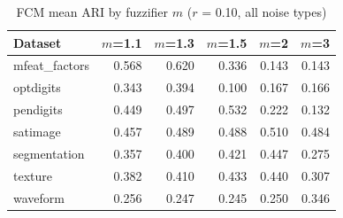 \begin{table}[t]
\centering
\scriptsize
\setlength{\tabcolsep}{3pt}
\caption{FCM mean ARI by fuzzifier $m$ ($r$ = 0.10, all noise types)}
\label{tab:fcm-m}
\begin{tabular}{lrrrrr}
\toprule
Dataset & $m$=1.1 & $m$=1.3 & $m$=1.5 & $m$=2 & $m$=3 \\
\midrule
mfeat\_factors & 0.568 & 0.620 & 0.336 & 0.143 & 0.143 \\
optdigits & 0.343 & 0.394 & 0.100 & 0.167 & 0.166 \\
pendigits & 0.449 & 0.497 & 0.532 & 0.222 & 0.132 \\
satimage & 0.457 & 0.489 & 0.488 & 0.510 & 0.484 \\
segmentation & 0.357 & 0.400 & 0.421 & 0.447 & 0.275 \\
texture & 0.382 & 0.410 & 0.433 & 0.440 & 0.307 \\
waveform & 0.256 & 0.247 & 0.245 & 0.250 & 0.346 \\
\bottomrule
\end{tabular}
\end{table}

